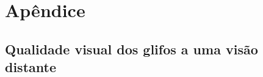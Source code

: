 \documentclass[
    12pt,                %
    oneside,            %
    a4paper,            %
    english,            %
    french,                %
    spanish,            %
    brazil                %
    ]{abntex2}
\begin{document}


\pagebreak
 \chapter{Apêndice}
 \section{Qualidade visual dos glifos a uma visão distante}
 \label{sec::qualidade_visual_longe}



\end{document}
